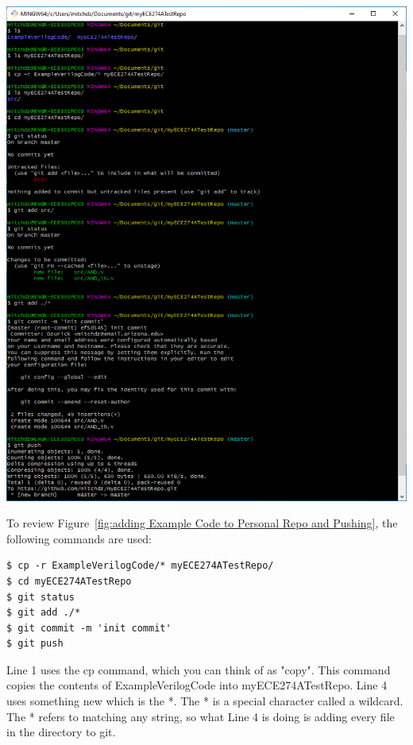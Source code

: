 \documentclass[12pt]{article}
\begin{document}
\begin{center}
    \includegraphics[scale=0.8]{viv_10.PNG}
    \label{fig:adding Example Code to Personal Repo and Pushing}
\end{center}


To review Figure~\ref{fig:adding Example Code to Personal Repo and Pushing}, the following commands are used:

\begin{lstlisting}
$ cp -r ExampleVerilogCode/* myECE274ATestRepo/
$ cd myECE274ATestRepo
$ git status
$ git add ./*
$ git commit -m 'init commit'
$ git push
\end{lstlisting}

Line 1 uses the cp command, which you can think of as "copy". This command copies the contents of ExampleVerilogCode into myECE274ATestRepo. Line 4 uses something new which is the *. The * is a special character called a wildcard. The * refers to matching any string, so what Line 4 is doing is adding every file in the directory to git.
\end{document}
